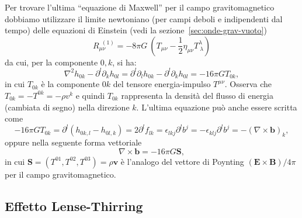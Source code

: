 Per trovare l'ultima ``equazione di Maxwell'' per il campo gravitomagnetico
dobbiamo utilizzare il limite newtoniano (per campi deboli e indipendenti dal
tempo) delle equazioni di Einstein (vedi la sezione~\ref{sec:onde-grav-vuoto})
\begin{equation}
R_{\mu \nu}^{\ \ (1)} = -8 \pi G \ 
\left( 
T_{\mu \nu} - \frac{1}{2} \eta_{\mu \nu} T^{\lambda}_{\ \lambda}
\right)
\end{equation}
da cui, per la componente $0,k$, si ha:
\begin{equation}
  \nabla^{2}h_{0k} - \partial^{l}\partial_{k} h_{0l} = \partial^{l}\partial_{l}
  h_{0k} - \partial^{l}\partial_{k} h_{0l} = -16\pi GT_{0k},
\end{equation}
in cui $T_{0k}$ è la componente $0k$ del tensore energia-impulso $T^{\mu \nu}$.
Osserva che $T_{0k} = - T^{0k} = - \rho v^k$ e quindi $T_{0k}$ rappresenta la
densità del flusso di energia (cambiata di segno) nella direzione $k$.  L'ultima
equazione può anche essere scritta come
\begin{equation}
  -16\pi GT_{0k} = \partial^{l}(h_{0k,l} - h_{0l,k}) = 2 \partial^{l} f_{lk} =
  \epsilon_{lkj} \partial^{l}b^{j} = -\epsilon_{klj} \partial^{l}b^{j} = -(\nabla
  \times \bm{b})_{k},
\end{equation}
oppure nella seguente forma vettoriale
\begin{equation}
  \nabla \times \bm{b} = - 16\pi G \bm{S},
\end{equation}
in cui $\bm{S} = (T^{01}, T^{02}, T^{03}) = \rho \bm{v}$ è l'analogo del
\index{vettore!di Poynting}vettore di Poynting $(\bm{E}\times\bm{B})/4\pi$ per
il campo gravitomagnetico.

\subsection{Effetto Lense-Thirring}
\label{sec:effetto-lense-thirring}

